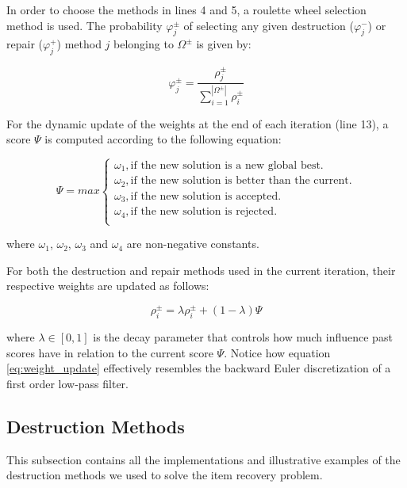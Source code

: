 \documentclass[conference]{IEEEtran}
\begin{document}
In order to choose the methods in lines 4 and 5, a roulette wheel selection method is used. The probability $\varphi^\pm_{j}$ of selecting any given destruction ($\varphi^-_{j}$) or repair ($\varphi^+_{j}$) method $j$ belonging to $\Omega^\pm$ is given by:

\begin{equation}\label{eq:line4_weight_prob}
\varphi^\pm_{j} = \frac{\rho^\pm_{j}}{\sum_{i=1}^{|\Omega^\pm|}\rho^\pm_{i}}
\end{equation}

For the dynamic update of the weights at the end of each iteration (line 13), a score $\Psi$ is computed according to the following equation:

\begin{equation*}\label{eq:score_formula}
\Psi = max \begin{cases} 
\omega_{1}, \text{if the new solution is a new global best.} \\
\omega_{2}, \text{if the new solution is better than the current.} \\
\omega_{3}, \text{if the new solution is accepted.} \\
\omega_{4}, \text{if the new solution is rejected.} \\
\end{cases}
\end{equation*}

where $\omega_{1}$, $\omega_{2}$, $\omega_{3}$ and $\omega_{4}$ are non-negative constants.

For both the destruction and repair methods used in the current iteration, their respective weights are updated as follows:

\begin{equation}\label{eq:weight_update}
\rho^\pm_{i} = \lambda \rho^\pm_{i} + (1 - \lambda)\Psi
\end{equation}

where $\lambda \in [0,1]$ is the decay parameter that controls how much influence past scores have in relation to the current score $\Psi$. Notice how equation \ref{eq:weight_update} effectively resembles the backward Euler discretization of a first order low-pass filter.

\subsection{Destruction Methods}

This subsection contains all the implementations and illustrative examples of the destruction methods we used to solve the item recovery problem.
\end{document}
